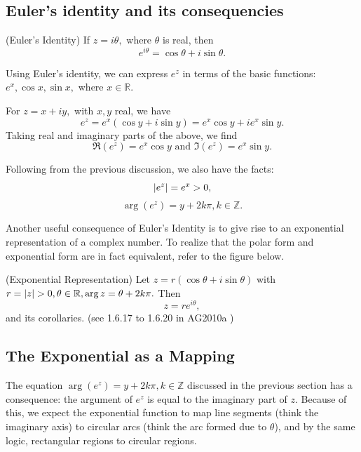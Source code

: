 \documentclass[11pt,reqno,oneside,a4paper]{article}
\begin{document}
\subsection{Euler's identity and its consequencies}
\begin{prop}
	(Euler's Identity)
	If $z = i\theta,$ where $\theta$ is real, then $$e^{i\theta} = \cos\theta + i\sin\theta.$$
\end{prop}

Using Euler's identity, we can express $e^z$ in terms of the basic functions: $e^x, \cos x, \sin x,$ where $x\in \mathbb{R}$.

\begin{cor}
	For $z=x+iy,$ with $x,y$ real, we have $$e^z = e^x(\cos y + i\sin y) = e^x \cos y + i e^x\sin y.$$
	Taking real and imaginary parts of the above, we find 
	$$\Re(e^z) = e^x \cos y \text{ and } \Im(e^z) = e^x \sin y.$$
\end{cor}

Following from the previous discussion, we also have the facts:
$$\left\lvert e^z\right\rvert = e^x >0,$$
$$\arg(e^z) = y + 2k\pi, k \in \mathbb{Z}.$$

Another useful consequence of Euler's Identity is to give rise to an exponential representation of a complex number. To realize that the polar form and exponential form are in fact equivalent, refer to the figure below. 

\begin{prop}
	(Exponential Representation)
	Let $z = r (\cos\theta + i\sin\theta)$ with $r=\left\lvert z\right\rvert >0, \theta \in \mathbb{R}, \arg z = \theta + 2k\pi.$ Then 
	$$z = re^{i\theta},$$
	and its corollaries. (see 1.6.17 to 1.6.20 in AG2010a \cite{AG2010a})
\end{prop}

\subsection{The Exponential as a Mapping}

The equation $\arg(e^z) = y + 2k\pi, k \in \mathbb{Z}$ discussed in the previous section has a consequence: the argument of $e^z$ is equal to the imaginary part of $z$. Because of this, we expect the exponential function to map line segments (think the imaginary axis) to circular arcs (think the arc formed due to $\theta$), and by the same logic, rectangular regions to circular regions. 
\end{document}
